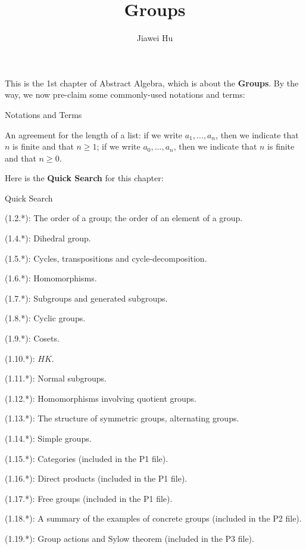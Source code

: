 \documentclass{article}
\title{\LARGE \textbf{Groups}}
\author{\large Jiawei Hu}
\begin{document}
\maketitle

This is the 1st chapter of Abstract Algebra, which is about the \textbf{Groups}. By the way, we now pre-claim some commonly-used notations and terms:
\begin{Df}{Notations and Terms}
    \begin{compactenum}
        \item An agreement for the length of a list: if we write $a_1, \dots, a_n$, then we indicate that $n$ is finite and that $n\geq 1$; if we write $a_0, \dots, a_n$, then we indicate that $n$ is finite and that $n\geq 0$.
    \end{compactenum}
\end{Df}

Here is the \textbf{Quick Search} for this chapter:
\begin{Th}{Quick Search}
    \begin{compactdesc}
        \item (1.2.*): The order of a group; the order of an element of a group.
        \item (1.4.*): Dihedral group.
        \item (1.5.*): Cycles, transpositions and cycle-decomposition.
        \item (1.6.*): Homomorphisms.
        \item (1.7.*): Subgroups and generated subgroups.
        \item (1.8.*): Cyclic groups.
        \item (1.9.*): Cosets.
        \item (1.10.*): $HK$.
        \item (1.11.*): Normal subgroups.
        \item (1.12.*): Homomorphisms involving quotient groups.
        \item (1.13.*): The structure of symmetric groups, alternating groups.
        \item (1.14.*): Simple groups.
        \item (1.15.*): Categories (included in the P1 file).
        \item (1.16.*): Direct products (included in the P1 file).
        \item (1.17.*): Free groups (included in the P1 file).
        \item (1.18.*): A summary of the examples of concrete groups (included in the P2 file).
        \item (1.19.*): Group actions and Sylow theorem (included in the P3 file).
    \end{compactdesc}
\end{Th}
\end{document}
